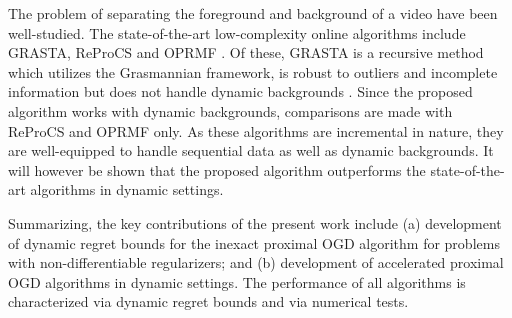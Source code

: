 \documentclass[draftcls,onecolumn,12pt]{IEEEtran}
\theoremstyle{plain}
\theoremstyle{plain}
\theoremstyle{remark}
\begin{document}
	
	
The problem of separating the foreground and background of a video have been well-studied. The state-of-the-art low-complexity online algorithms include  GRASTA\cite{he2012incremental}, ReProCS \cite{reprocs} and OPRMF \cite{wang2012probabilistic}. Of these, GRASTA is a recursive method which utilizes the Grasmannian framework, is robust to outliers and incomplete information but does not handle dynamic backgrounds \cite{seidel2014prost}. Since the proposed algorithm works with dynamic backgrounds, comparisons are made with  ReProCS and OPRMF only. As these algorithms are incremental in nature, they are well-equipped to handle sequential data as well as dynamic backgrounds. It will however be shown that the proposed algorithm outperforms the state-of-the-art algorithms in dynamic settings. 

Summarizing, the key contributions of the present work include (a) development of dynamic regret bounds for the inexact proximal OGD algorithm for problems with non-differentiable regularizers; and (b) development of accelerated proximal OGD algorithms in dynamic settings. The performance of all algorithms is characterized via dynamic regret bounds and via numerical tests. 
\end{document}
